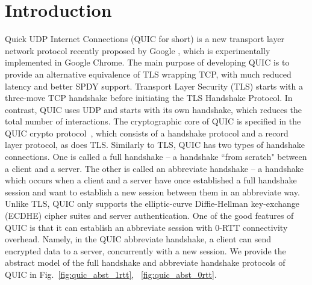 \section{Introduction} \label{sec:intro}
Quick UDP Internet Connections (QUIC for short) is a
new transport layer network protocol recently proposed
by Google \cite{QUIC}, which is experimentally
implemented in Google Chrome.
The main purpose of developing QUIC is to provide an
alternative equivalence of TLS wrapping TCP, with much
reduced latency and better SPDY support.
Transport Layer Security (TLS) starts with a three-move
TCP handshake before initiating the TLS Handshake
Protocol.
In contrast, QUIC uses UDP and starts with its own
handshake, which reduces the total number of
interactions.
The cryptographic core of QUIC is specified in the QUIC
crypto protocol~\cite{QUIC:Crypto}, which consists of a
handshake protocol and a record layer protocol, as does
TLS.
Similarly to TLS, QUIC has two types of handshake
connections.
One is called a full handshake -- a handshake
``from scratch" between a client and a server.
The other is called an abbreviate handshake -- a
handshake which occurs when a client and a server have
once established a full handshake session and want to
establish a new session between them in an abbreviate way.
Unlike TLS, QUIC only supports the elliptic-curve
Diffie-Hellman key-exchange (ECDHE) cipher suites and
server authentication.
%
One of the good features of QUIC is that it can
establish an abbreviate session with $0$-RTT
connectivity overhead.
Namely, in the QUIC abbreviate handshake, a client can send
encrypted data to a server, concurrently with a new session.
We provide the abstract model of the full handshake and
abbreviate handshake protocols of QUIC in
Fig.~\ref{fig:quic_abst_1rtt}, ~\ref{fig:quic_abst_0rtt}.


